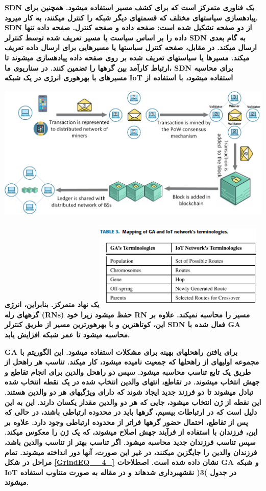 \documentclass{article} %
\begin{document}
\noindent 
{\bf SDN یک فناوری متمرکز است که برای کشف مسیر استفاده میشود. همچنین برای پیادهسازی سیاستهای مختلف که قسمتهای دیگر شبکه را کنترل میکنند، به کار میرود. SDN از دو صفحه تشکیل شده است: صفحه داده و صفحه کنترل. صفحه داده تنها داده را بر اساس سیاست یا مسیر تعریف شده توسط کنترلر SDN به گام بعدی ارسال میکند. در مقابل، صفحه کنترل سیاستها یا مسیرهایی برای ارسال داده تعریف میکند. مسیرها یا سیاستهای تعریف شده بر روی صفحه داده پیادهسازی میشوند تا ارتباط کارآمد بین گرهها را تضمین کنند. در سناریوی ما، SDN برای محاسبه مسیرهای با بهرهوری انرژی در یک شبکه IoT استفاده میشود، با استفاده از \includegraphics*[width=6.71in, height=2.84in]{image7}\includegraphics*[width=3.20in, height=1.68in]{image8}یک نهاد متمرکز. بنابراین، انرژی گرههای رله (RNs) حفظ میشود زیرا خود RN مسیر را محاسبه نمیکند. علاوه بر این، کوتاهترین و با بهرهورترین مسیر از طریق کنترلر SDN فعال شده با GA محاسبه میشود تا عمر شبکه افزایش یابد.}

\noindent 
{\bf GA برای یافتن راهحلهای بهینه برای مشکلات استفاده میشود. این الگوریتم با مجموعه اولیهای از راهحلها که جمعیت نامیده میشود، کار میکند. تناسب هر راهحل از طریق یک تابع تناسب محاسبه میشود. سپس دو راهحل والدین برای انجام تقاطع و جهش انتخاب میشوند. در تقاطع، انتهای والدین انتخاب شده در یک نقطه انتخاب شده تبادل میشوند تا دو فرزند جدید ایجاد شوند که دارای ویژگیهای هر دو والدین هستند. این نقطه از ژن انتخاب میشود، جایی که هر دو والدین مقدار یکسان دارند. این به این دلیل است که در ارتباطات بیسیم، گرهها باید در محدوده ارتباطی باشند، در حالی که پس از تقاطع، احتمال حضور گرهها فراتر از محدوده ارتباطی وجود دارد. علاوه بر این، فرزندان با استفاده از فرآیند جهش اصلاح میشوند، که یک ژن را معکوس میکند. سپس تناسب فرزندان جدید محاسبه میشود. اگر تناسب بهتر از تناسب والدین باشد، فرزندان والدین را جایگزین میکنند، در غیر این صورت، آنها دور انداخته میشوند. تمام مراحل در شکل \eqref{GrindEQ__4_} نشان داده شده است. اصطلاحات GA و شبکه IoT در جدول )3( نقشهبرداری شدهاند و در مقاله به صورت متناوب استفاده میشوند.}
\end{document}
